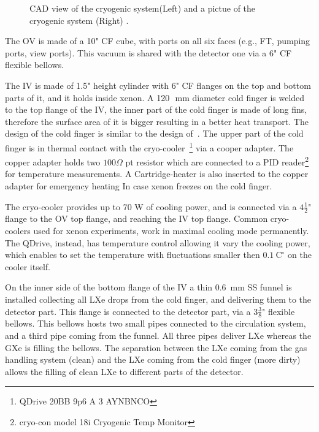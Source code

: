 \begin{figure}
\begin{subfigure}[c]{0.25\textheight}
					           \end{subfigure}
						           \caption{ CAD view of the cryogenic system(Left) and a pictue of the cryogenic system (Right) . \label{fig:cryo}}
						   \end{figure}

The OV is made of a 10" CF cube, with ports on all six faces (e.g., FT, pumping ports, view ports). This vacuum is shared with the detector one via a 6" CF flexible bellows.

The IV is made of 1.5" height cylinder with 6" CF flanges on the top and bottom parts of it, and it holds inside xenon. A 120~\,mm diameter cold finger is welded to the top flange of the IV, the inner part of the cold finger is made of long fins, therefore the surface area of it is bigger resulting in a better heat transport. The design of the cold finger is similar to the design of~\cite{xe100_instr2012}. The upper part of the cold finger is in thermal contact with the cryo-cooler~\footnote{QDrive 20BB 9p6 A 3 AYNBNCO} via a cooper adapter. The copper adapter holds two $100\Omega$ pt resistor which are connected to a PID reader\footnote{cryo-con model 18i Cryogenic Temp Monitor} for temperature measurements. A Cartridge-heater is also inserted to the copper adapter for emergency heating In case xenon freezes on the cold finger. 

The cryo-cooler provides up to 70 W of cooling power, and is connected via a $4\frac{1}{2}$" flange to the OV top flange, and reaching the IV top flange. 
Common cryo-coolers used for xenon experiments, work in maximal cooling mode permanently. The QDrive, instead, has temperature control allowing 
it vary the cooling power, which enables to set the temperature with fluctuations smaller then $0.1~\mathrm{C^{\circ}}$ on the cooler itself.

On the inner side of the bottom flange of the IV a thin 0.6~mm SS funnel is installed collecting all LXe drops from the cold finger, and delivering 
them to the  detector part. This flange is connected to the detector part, via a $3\frac{3}{8}$" flexible bellows. This bellows hosts two small pipes 
connected to the circulation system, and a third pipe coming from the funnel. All three pipes deliver LXe whereas the GXe is filling the bellows. The separation between the LXe coming from the gas handling system (clean) and the LXe coming from the cold finger (more dirty) allows the filling of clean LXe to different parts of the detector. 
